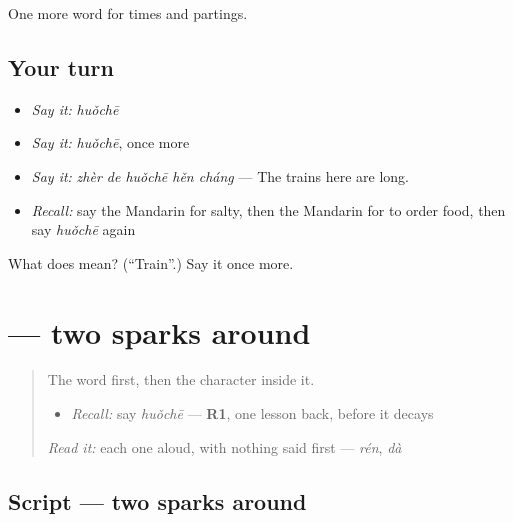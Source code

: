\begin{grammarlens}[title={What you've built}]
One more word for times and partings.
\end{grammarlens}

\subsection*{Your turn}
\begin{itemize}
\raggedright
  \item \emph{Say it:} \emph{huǒchē}
  \item \emph{Say it:} \emph{huǒchē}, once more
  \item \emph{Say it:} \emph{zhèr de huǒchē hěn cháng} — The trains here are long.
  \item \emph{Recall:} say the Mandarin for salty, then the Mandarin for to order food, then say \emph{huǒchē} again
\end{itemize}

\begin{tcolorbox}[breakable,colback=teal!4,colframe=teal!35!black,title={Before you move on}]
What does  mean? (\textquotedblleft{}Train\textquotedblright{}.) Say it once more.
\end{tcolorbox}
\section[\texorpdfstring{\zh{火} (huǒ)}{火 (huǒ)}]{ — two sparks around }

\label{lesson:ZH-W72-huo}



\begin{quote}
The word first, then the character inside it.

\begin{itemize}
\raggedright
  \item \emph{Recall:} say \emph{huǒchē} — \textbf{R1}, one lesson back, before it decays
\end{itemize}

\begin{quote}
 
\end{quote}

\emph{Read it:} each one aloud, with nothing said first — \emph{rén}, \emph{dà}
\end{quote}

\subsection*{Script — two sparks around }

